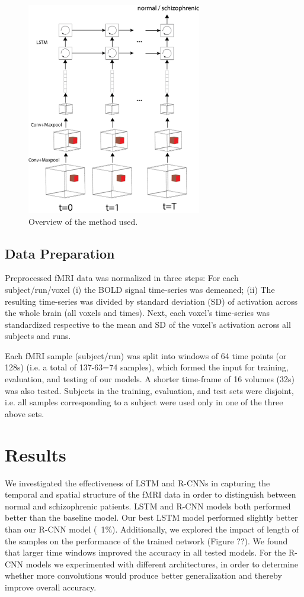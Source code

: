 \documentclass{article}
\begin{document}
\begin{figure}[t]
\begin{center}
\includegraphics[width=3in]{figures/overview.png}
\end{center}
\caption{Overview of the method used.}
\label{fig1}
\end{figure}

\subsection{Data Preparation}

Preprocessed fMRI data was normalized in three steps: For each subject/run/voxel (i) the BOLD signal time-series was demeaned; (ii) The resulting time-series was divided by standard deviation (SD) of activation across the whole brain (all voxels and times). Next, each voxel's time-series was standardized respective to the mean and SD of the voxel's activation across all subjects and runs.

Each fMRI sample (subject/run) was split into windows of 64 time points (or 128s) (i.e. a total of 137-63=74 samples), which formed the input for training, evaluation, and testing of our models. A shorter time-frame of 16 volumes (32s) was also tested. Subjects in the training, evaluation, and test sets were disjoint, i.e. all samples corresponding to a subject were used only in one of the three above sets.

\section*{Results}

We investigated the effectiveness of LSTM and R-CNNs in capturing the temporal and spatial structure of the fMRI data in order to distinguish between normal and schizophrenic patients. LSTM and R-CNN models both performed better than the baseline model. Our best LSTM model performed slightly better than our R-CNN model (~1\%). Additionally, we explored the impact of length of the samples on the performance of the trained network (Figure ??). We found that larger time windows improved the accuracy in all tested models. For the R-CNN models we experimented with different architectures, in order to determine whether more convolutions would produce better generalization and thereby improve overall accuracy. 
\end{document}
